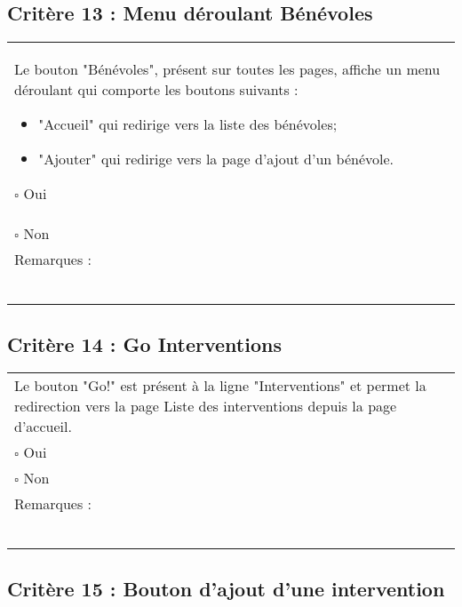   		
  			\subsection*{Critère 13 : Menu déroulant Bénévoles}
	
	\begin{center}
    	 		\begin{tabular}[h]{|p{}|}
			\hline
				Le bouton "Bénévoles", présent sur toutes les pages, affiche un menu déroulant qui comporte les boutons suivants : 
				\begin{itemize}
					\item "Accueil" qui redirige vers la liste des bénévoles;
					\item "Ajouter" qui redirige vers la page d'ajout d'un bénévole.
				\end{itemize}
				$\square$ Oui  \\ $\square$ Non \\\hline Remarques : \\ ~\\
			 \\\hline
     		\end{tabular}
  		\end{center}
  		
  		
  			
  		
  		\subsection*{Critère 14 : Go Interventions}
	
	\begin{center}
    	 		\begin{tabular}[h]{|p{}|}
			\hline
				Le bouton "Go!" est présent à la ligne "Interventions" et permet la redirection vers la page Liste des interventions depuis la page d'accueil. \\
				$\square$ Oui  \\ $\square$ Non \\\hline Remarques : \\ ~\\
			 \\\hline
     		\end{tabular}
  		\end{center}	
  		
  		
  	\subsection*{Critère 15 : Bouton d'ajout d'une intervention}
	
